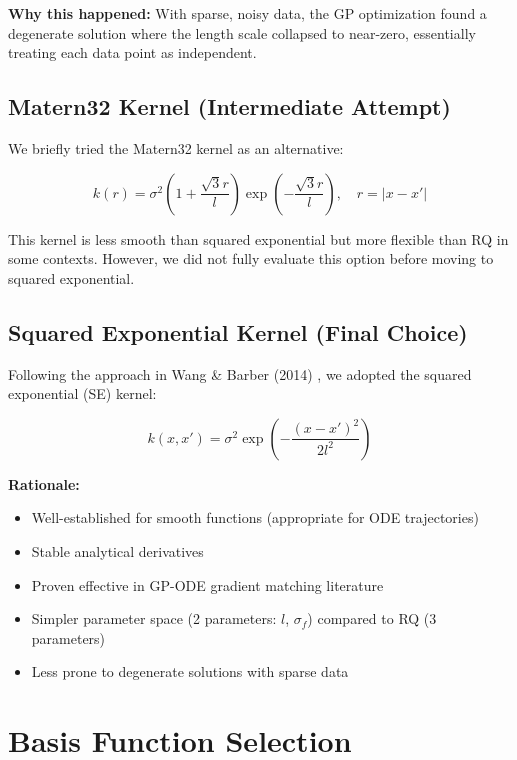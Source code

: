 \documentclass[11pt]{article}
\begin{document}
\textbf{Why this happened:} With sparse, noisy data, the GP optimization found a degenerate solution where the length scale collapsed to near-zero, essentially treating each data point as independent.

\subsection{Matern32 Kernel (Intermediate Attempt)}

We briefly tried the Matern32 kernel as an alternative:

\begin{equation}
k(r) = \sigma^2\left(1 + \frac{\sqrt{3}r}{l}\right)\exp\left(-\frac{\sqrt{3}r}{l}\right), \quad r = |x - x'|
\end{equation}

This kernel is less smooth than squared exponential but more flexible than RQ in some contexts. However, we did not fully evaluate this option before moving to squared exponential.

\subsection{Squared Exponential Kernel (Final Choice)}

Following the approach in Wang \& Barber (2014) \cite{wang2014}, we adopted the squared exponential (SE) kernel:

\begin{equation}
k(x, x') = \sigma^2 \exp\left(-\frac{(x-x')^2}{2l^2}\right)
\end{equation}

\textbf{Rationale:}
\begin{itemize}
    \item Well-established for smooth functions (appropriate for ODE trajectories)
    \item Stable analytical derivatives
    \item Proven effective in GP-ODE gradient matching literature
    \item Simpler parameter space (2 parameters: $l$, $\sigma_f$) compared to RQ (3 parameters)
    \item Less prone to degenerate solutions with sparse data
\end{itemize}

\section{Basis Function Selection}
\end{document}
